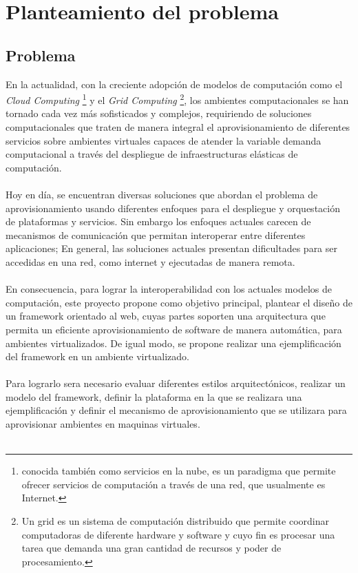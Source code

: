 \chapter{Planteamiento del problema}
\label{capproblema}

\section{Problema}
En la actualidad, con la creciente adopción de modelos de computación como el \emph{Cloud Computing} \footnote{conocida también como servicios en la nube, es un paradigma que permite ofrecer servicios de computación a través de una red, que usualmente es Internet.} y el \emph{Grid Computing} \footnote{Un grid es un sistema de computación distribuido que permite coordinar computadoras de diferente hardware y software y cuyo fin es procesar una tarea que demanda una gran cantidad de recursos y poder de procesamiento.}, los ambientes computacionales se han tornado cada vez más sofisticados y complejos, requiriendo de soluciones computacionales que traten de manera integral el aprovisionamiento de diferentes servicios sobre ambientes virtuales capaces de atender la variable demanda computacional a través del despliegue de infraestructuras elásticas de computación.\\
\\
Hoy en día, se encuentran diversas soluciones que abordan el problema de aprovisionamiento usando diferentes enfoques para el despliegue y orquestación de plataformas y servicios. Sin embargo los enfoques actuales carecen de mecanismos de comunicación que permitan interoperar entre diferentes aplicaciones; En general, las soluciones actuales presentan dificultades para ser accedidas en una red, como internet y ejecutadas de manera remota.\\
\\
En consecuencia, para lograr la interoperabilidad con los actuales modelos de computación, este proyecto propone como objetivo principal, plantear el diseño de un framework orientado al web, cuyas partes soporten una arquitectura que permita un eficiente aprovisionamiento de software de manera automática, para ambientes virtualizados. De igual modo, se propone realizar una ejemplificación del framework en un ambiente virtualizado.\\
\\
Para lograrlo sera necesario evaluar diferentes estilos arquitectónicos, realizar un modelo del framework, definir la plataforma en la que se realizara una ejemplificación y definir el mecanismo de aprovisionamiento que se utilizara para aprovisionar ambientes en maquinas virtuales.\\ 
\\

